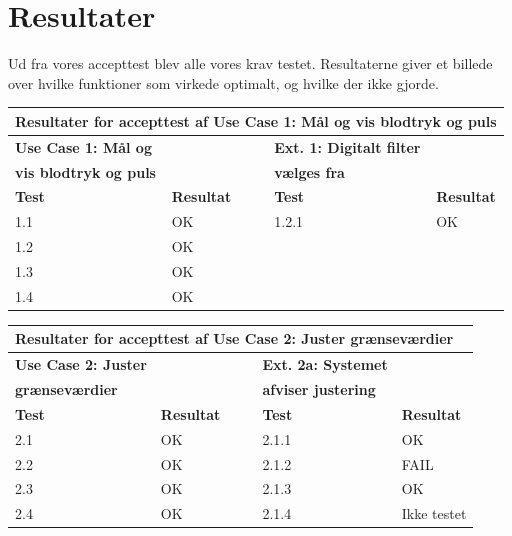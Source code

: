 \section{Resultater}

Ud fra vores accepttest blev alle vores krav testet. Resultaterne giver et billede over hvilke funktioner som virkede optimalt, og hvilke der ikke gjorde. 

\begin{table}[h!]
	\centering
	\begin{tabular}{llllll}
		\multicolumn{6}{l}{\cellcolor[HTML]{187ABD}\textbf{Resultater for accepttest af Use Case 1: Mål og vis blodtryk og puls}} \\ \hline
		\textbf{Use Case 1: Mål og} & \multicolumn{1}{l|}{} &  & \multicolumn{1}{l|}{} & \textbf{Ext. 1: Digitalt filter} &  \\
		\textbf{vis blodtryk og puls} & \multicolumn{1}{l|}{} &  & \multicolumn{1}{l|}{} & \textbf{vælges fra} &  \\ \cline{1-2} \cline{5-6} 
		\textbf{Test} & \multicolumn{1}{l|}{\textbf{Resultat}} &  & \multicolumn{1}{l|}{} & \textbf{Test} & \textbf{Resultat} \\ \cline{1-2} \cline{5-6} 
		1.1 & \multicolumn{1}{l|}{OK} &  & \multicolumn{1}{l|}{} & 1.2.1 & OK \\ \cline{1-2} \cline{5-6} 
		1.2 & \multicolumn{1}{l|}{OK} &  & \multicolumn{1}{l|}{} &  &  \\ \cline{1-2} \cline{5-6} 
		1.3 & \multicolumn{1}{l|}{OK} &  & \multicolumn{1}{l|}{} &  &  \\ \cline{1-2} \cline{5-6} 
		1.4 & \multicolumn{1}{l|}{OK} &  & \multicolumn{1}{l|}{} &  & 
	\end{tabular}
\end{table}

\begin{table}[h!]
	\centering
	\begin{tabular}{llllll}
		\multicolumn{6}{l}{\cellcolor[HTML]{187ABD}\textbf{Resultater for accepttest af Use Case 2: Juster grænseværdier}} \\ \hline
		\textbf{Use Case 2: Juster} & \multicolumn{1}{l|}{} &  & \multicolumn{1}{l|}{} & \textbf{Ext. 2a: Systemet} &  \\
		\textbf{grænseværdier} & \multicolumn{1}{l|}{} &  & \multicolumn{1}{l|}{} & \textbf{afviser justering} &  \\ \cline{1-2} \cline{5-6} 
		\textbf{Test} & \multicolumn{1}{l|}{\textbf{Resultat}} &  & \multicolumn{1}{l|}{} & \textbf{Test} & \textbf{Resultat} \\ \cline{1-2} \cline{5-6} 
		2.1 & \multicolumn{1}{l|}{OK} &  & \multicolumn{1}{l|}{} & 2.1.1 & OK \\ \cline{1-2} \cline{5-6} 
		2.2 & \multicolumn{1}{l|}{OK} &  & \multicolumn{1}{l|}{} & 2.1.2 & FAIL \\ \cline{1-2} \cline{5-6} 
		2.3 & \multicolumn{1}{l|}{OK} &  & \multicolumn{1}{l|}{} & 2.1.3 & OK \\ \cline{1-2} \cline{5-6} 
		2.4 & \multicolumn{1}{l|}{OK} &  & \multicolumn{1}{l|}{} & 2.1.4 & Ikke testet
	\end{tabular}
\end{table}

